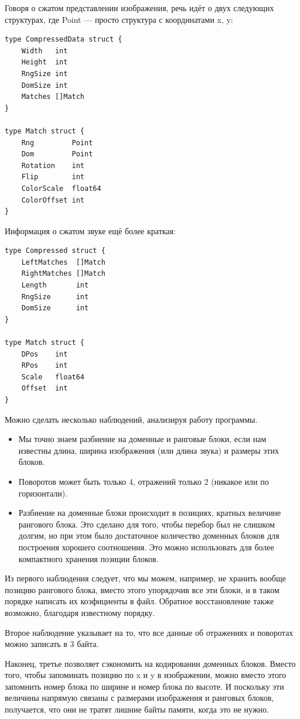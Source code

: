 \documentclass[bachelor,paper]{pmk-graduate}
\theoremstyle{definition}
\begin{document}
Говоря о сжатом представлении изображения, речь идёт о двух следующих структурах, где Point --- просто структура с координатами x, y:
\begin{verbatim}
type CompressedData struct {
    Width   int
    Height  int
    RngSize int
    DomSize int
    Matches []Match
}

type Match struct {
    Rng         Point
    Dom         Point
    Rotation    int
    Flip        int
    ColorScale  float64
    ColorOffset int
}
\end{verbatim}

Информация о сжатом звуке ещё более краткая:
\begin{verbatim}
type Compressed struct {
    LeftMatches  []Match
    RightMatches []Match
    Length       int
    RngSize      int
    DomSize      int
}

type Match struct {
    DPos    int
    RPos    int
    Scale   float64
    Offset  int
}
\end{verbatim}

Можно сделать несколько наблюдений, анализируя работу программы.
\begin{itemize}
  \item Мы точно знаем разбиение на доменные и ранговые блоки, если нам известны длина, ширина изображения (или длина звука) и размеры этих блоков.
  \item Поворотов может быть только 4, отражений только 2 (никакое или по горизонтали).
  \item Разбиение на доменные блоки происходит в позициях, кратных величине рангового блока. Это сделано для того, чтобы перебор был не слишком долгим, но при этом было достаточное количество доменных блоков для построения хорошего соотношения. Это можно использовать для более компактного хранения позиции блоков.
\end{itemize}

Из первого наблюдения следует, что мы можем, например, не хранить вообще позицию рангового блока, вместо этого упорядочив все эти блоки, и в таком порядке написать их коэфициенты в файл. Обратное восстановление также возможно, благодаря известному порядку.

Второе наблюдение указывает на то, что все данные об отражениях и поворотах можно записать в 3 байта.

Наконец, третье позволяет сэкономить на кодировании доменных блоков. Вместо того, чтобы запоминать позицию по x и y в изображении, можно вместо этого запомнить номер блока по ширине и номер блока по высоте. И поскольку эти величины напрямую связаны с размерами изображения и ранговых блоков, получается, что они не тратят лишние байты памяти, когда это не нужно.
\end{document}
